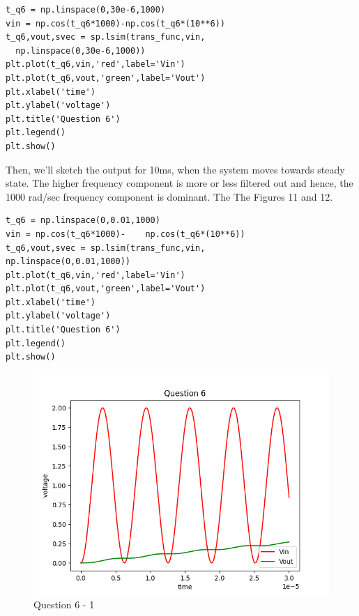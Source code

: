 \documentclass[11pt, a4paper]{article}
\begin{document}
\begin{verbatim}
t_q6 = np.linspace(0,30e-6,1000)
vin = np.cos(t_q6*1000)-np.cos(t_q6*(10**6))
t_q6,vout,svec = sp.lsim(trans_func,vin,
  np.linspace(0,30e-6,1000))
plt.plot(t_q6,vin,'red',label='Vin')
plt.plot(t_q6,vout,'green',label='Vout')
plt.xlabel('time')
plt.ylabel('voltage')
plt.title('Question 6')
plt.legend()
plt.show()
\end{verbatim}

Then, we'll sketch the output for 10ms, when the system moves towards steady state. The higher frequency component is more or less filtered out and hence, the 1000 rad/sec frequency component is dominant. The  The Figures 11 and 12. 

\begin{verbatim}
t_q6 = np.linspace(0,0.01,1000)
vin = np.cos(t_q6*1000)-    np.cos(t_q6*(10**6))
t_q6,vout,svec = sp.lsim(trans_func,vin,
np.linspace(0,0.01,1000))
plt.plot(t_q6,vin,'red',label='Vin')
plt.plot(t_q6,vout,'green',label='Vout')
plt.xlabel('time')
plt.ylabel('voltage')
plt.title('Question 6')
plt.legend()
plt.show()
\end{verbatim}

\begin{figure}[!tbh]
   	\centering
  \includegraphics[scale=0.5]{Q6-1.png} 
    \caption{Question 6 - 1} 	
    \label{q6}
   \end{figure} 
\end{document}
